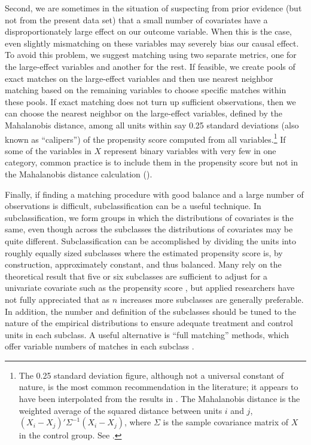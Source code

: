 \documentclass[11pt,titlepage]{article}
\begin{document}
Second, we are sometimes in the situation of suspecting from prior
evidence (but not from the present data set) that a small number of
covariates have a disproportionately large effect on our outcome
variable.  When this is the case, even slightly mismatching on these
variables may severely bias our causal effect.  To avoid this problem,
we suggest matching using two separate metrics, one for the
large-effect variables and another for the rest.  If feasible, we
create pools of exact matches on the large-effect variables and then
use nearest neighbor matching based on the remaining variables to
choose specific matches within these pools.  If exact matching does
not turn up sufficient observations, then we can choose the nearest
neighbor on the large-effect variables, defined by the Mahalanobis
distance, among all units within say 0.25 standard deviations (also
known as ``calipers'') of the propensity score computed from all
variables.\footnote{The 0.25 standard deviation figure, although not a
  universal constant of nature, is the most common recommendation in
  the literature; it appears to have been interpolated from the
  results in \citet{CocRub73}.  The Mahalanobis distance is the
  weighted average of the squared distance between units $i$ and $j$,
  $(X_i-X_j)'\Sigma^{-1}(X_i-X_j)$, where $\Sigma$ is the sample
  covariance matrix of $X$ in the control group.  See
  \cite{RubTho00}.}  If some of the variables in $X$ represent binary
variables with very few in one category, common practice is to include
them in the propensity score but not in the Mahalanobis distance
calculation (\citealp{GuRos93, RubTho00}).

Finally, if finding a matching procedure with good balance and a large
number of observations is difficult, subclassification can be a useful
technique.  In subclassification, we form groups in which the
distributions of covariates is the same, even though across the
subclasses the distributions of covariates may be quite different.
Subclassification can be accomplished by dividing the units into
roughly equally sized subclasses where the estimated propensity score
is, by construction, approximately constant, and thus balanced.  Many
rely on the theoretical result that five or six subclasses are
sufficient to adjust for a univariate covariate such as the propensity
score \citep{Cochran68,RosRub84}, but applied researchers have not
fully appreciated that as $n$ increases more subclasses are generally
preferable.  In addition, the number and definition of the subclasses
should be tuned to the nature of the empirical distributions to ensure
adequate treatment and control units in each subclass.  A useful
alternative is ``full matching'' methods, which offer variable numbers
of matches in each subclass \citep{Hansen04}.
\end{document}
